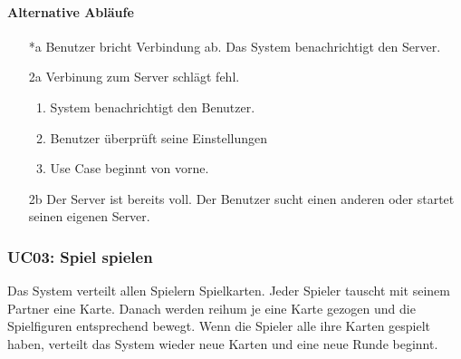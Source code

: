 \documentclass[a4paper,12pt,halfparskip,DIV14]{scrartcl}
\begin{document}
\paragraph{Alternative Abläufe}
\begin{enumerate}
	\item[*a] Benutzer bricht Verbindung ab.\newline
	Das System benachrichtigt den Server.
	\item[2a] Verbinung zum Server schlägt fehl.
	\begin{enumerate}
		\item System benachrichtigt den Benutzer.
		\item Benutzer überprüft seine Einstellungen
		\item Use Case beginnt von vorne.
	\end{enumerate}
	\item[2b] Der Server ist bereits voll.\newline
	Der Benutzer sucht einen anderen oder startet seinen eigenen Server.
\end{enumerate}

\subsubsection{UC03: Spiel spielen}\label{ssub:uc03_spiel_erstellen}
Das System verteilt allen Spielern Spielkarten. Jeder Spieler tauscht mit seinem Partner eine Karte. Danach werden reihum je eine Karte gezogen und die Spielfiguren entsprechend bewegt. Wenn die Spieler alle ihre Karten gespielt haben, verteilt das System wieder neue Karten und eine neue Runde beginnt. 
\end{document}
